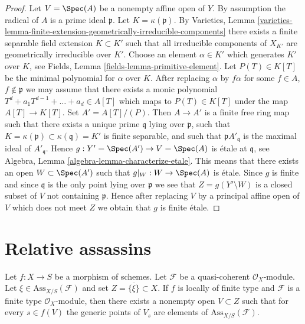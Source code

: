 \begin{proof}
Let $V = \Spec(A)$ be a nonempty affine open of $Y$.
By assumption the radical of $A$ is a prime ideal $\mathfrak p$.
Let $K = \kappa(\mathfrak p)$. By
Varieties, Lemma
\ref{varieties-lemma-finite-extension-geometrically-irreducible-components}
there exists a finite separable field extension
$K \subset K'$ such that all irreducible components of $X_{K'}$ are
geometrically irreducible over $K'$.
Choose an element $\alpha \in K'$ which generates $K'$ over
$K$, see
Fields, Lemma \ref{fields-lemma-primitive-element}.
Let $P(T) \in K[T]$ be the minimal polynomial for $\alpha$ over $K$.
After replacing $\alpha$ by $f \alpha$ for some
$f \in A$, $f \not \in \mathfrak p$
we may assume that there exists a monic polynomial
$T^d + a_1T^{d - 1} + \ldots + a_d \in A[T]$ which maps to
$P(T) \in K[T]$ under the map $A[T] \to K[T]$.
Set $A' = A[T]/(P)$. Then $A \to A'$ is a finite free ring map
such that there exists a unique prime $\mathfrak q$ lying over
$\mathfrak p$, such that
$K = \kappa(\mathfrak p) \subset \kappa(\mathfrak q) = K'$
is finite separable, and such that $\mathfrak pA'_{\mathfrak q}$
is the maximal ideal of $A'_{\mathfrak q}$.
Hence $g : Y' = \Spec(A') \to V = \Spec(A)$
is \'etale at $\mathfrak q$, see
Algebra, Lemma \ref{algebra-lemma-characterize-etale}.
This means that there exists an open $W \subset \Spec(A')$ such
that $g|_W : W \to \Spec(A)$ is \'etale.
Since $g$ is finite and since $\mathfrak q$ is the only point lying over
$\mathfrak p$ we see that $Z = g(Y' \setminus W)$ is a closed subset of $V$
not containing $\mathfrak p$. Hence after replacing $V$ by a principal
affine open of $V$ which does not meet $Z$ we obtain that $g$ is finite
\'etale.
\end{proof}







\section{Relative assassins}
\label{section-assassin}

\begin{lemma}
\label{lemma-relative-assassin-in-neighbourhood}
Let $f : X \to S$ be a morphism of schemes.
Let $\mathcal{F}$ be a quasi-coherent $\mathcal{O}_X$-module.
Let $\xi \in \text{Ass}_{X/S}(\mathcal{F})$ and set
$Z = \overline{\{\xi\}} \subset X$.
If $f$ is locally of finite type and $\mathcal{F}$ is a
finite type $\mathcal{O}_X$-module, then there exists a nonempty
open $V \subset Z$ such that for every $s \in f(V)$ the generic
points of $V_s$ are elements of $\text{Ass}_{X/S}(\mathcal{F})$.
\end{lemma}

